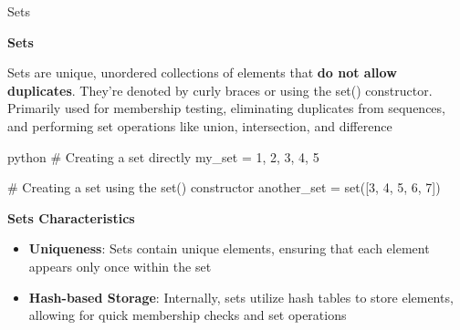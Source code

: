 \documentclass[
	11pt, 
]{beamer}
\begin{document}
\begin{frame}[fragile]{Sets}
\scriptsize
    
\begin{block}{\textbf{Sets}}
    
Sets are unique, unordered collections of elements that \textbf{do not allow duplicates}. They're denoted by curly braces {} or using the set() constructor. Primarily used for membership testing, eliminating duplicates from sequences, and performing set operations like union, intersection, and difference

\end{block}
\begin{mintedbox}{python}
# Creating a set directly
my_set = {1, 2, 3, 4, 5}

# Creating a set using the set() constructor
another_set = set([3, 4, 5, 6, 7]) 
\end{mintedbox}

\begin{exampleblock}{\textbf{Sets Characteristics}}
    \begin{itemize}
        \item \textbf{Uniqueness}: Sets contain unique elements, ensuring that each element appears only once within the set
        \item \textbf{Hash-based Storage}: Internally, sets utilize hash tables to store elements, allowing for quick membership checks and set operations
    \end{itemize}    
\end{exampleblock}


\end{frame}



\end{document}
